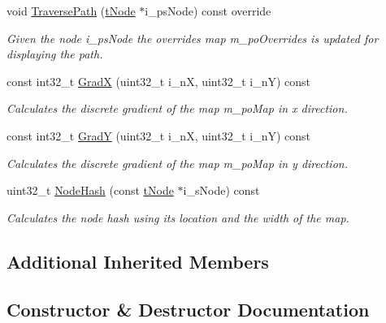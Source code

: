 \begin{DoxyCompactItemize}
void \mbox{\hyperlink{classplanner_1_1c_planner_ad9389067cbc3fa6fb1c2efdf3f344664}{Traverse\+Path}} (\mbox{\hyperlink{structplanner_1_1t_node}{t\+Node}} $\ast$i\+\_\+ps\+Node) const override
\begin{DoxyCompactList}\small\item\em Given the node i\+\_\+ps\+Node the overrides map m\+\_\+po\+Overrides is updated for displaying the path. \end{DoxyCompactList}\item 
\mbox{\label{classplanner_1_1c_planner_a305594663bc48ba50a719f441e4c1780}} 
const int32\+\_\+t \mbox{\hyperlink{classplanner_1_1c_planner_a305594663bc48ba50a719f441e4c1780}{GradX}} (uint32\+\_\+t i\+\_\+nX, uint32\+\_\+t i\+\_\+nY) const
\begin{DoxyCompactList}\small\item\em Calculates the discrete gradient of the map m\+\_\+po\+Map in x direction. \end{DoxyCompactList}\item 
\mbox{\label{classplanner_1_1c_planner_aa8a42bd5d745de90ccb900a6feea945a}} 
const int32\+\_\+t \mbox{\hyperlink{classplanner_1_1c_planner_aa8a42bd5d745de90ccb900a6feea945a}{GradY}} (uint32\+\_\+t i\+\_\+nX, uint32\+\_\+t i\+\_\+nY) const
\begin{DoxyCompactList}\small\item\em Calculates the discrete gradient of the map m\+\_\+po\+Map in y direction. \end{DoxyCompactList}\item 
uint32\+\_\+t \mbox{\hyperlink{classplanner_1_1c_planner_a5ae4464a4d418cda71f4a8133d592c93}{Node\+Hash}} (const \mbox{\hyperlink{structplanner_1_1t_node}{t\+Node}} $\ast$i\+\_\+s\+Node) const
\begin{DoxyCompactList}\small\item\em Calculates the node hash using its location and the width of the map. \end{DoxyCompactList}\end{DoxyCompactItemize}
\subsection*{Additional Inherited Members}


\subsection{Constructor \& Destructor Documentation}
\mbox{\label{classplanner_1_1c_planner_a4f425d47b277f000d34df04de9995274}} 
